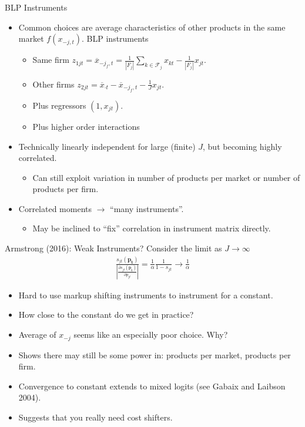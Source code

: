 \begin{frame}{BLP Instruments}
\begin{itemize}
\item Common choices are average characteristics of other products in the same market $f(x_{-j,t})$. \alert{BLP instruments}
\begin{itemize}
\item Same firm $z_{1jt} = \overline{x}_{-j_f,t} = \frac{1}{\left\vert{F_j}\right\vert}  \sum_{k \in \mathcal{F}_j} x_{kt} - \frac{1}{\left\vert{F_j}\right\vert} x_{jt}$.
\item Other firms $z_{2jt}=\overline{x}_{\cdot t} - \overline{x}_{-j_f,t} - \frac{1}{J} x_{jt}$.
\item Plus regressors $(1, x_{jt})$.
\item Plus higher order interactions 
\end{itemize}
\item Technically linearly independent for large (finite) $J$, but becoming highly correlated.
\begin{itemize}
\item Can still exploit variation in number of products per market or number of products per firm.
\end{itemize}
\item Correlated moments $\rightarrow$ ``many instruments''.
\begin{itemize}
\item May be inclined to ``fix'' correlation in instrument matrix directly.
\end{itemize}
\end{itemize}
\end{frame}


\begin{frame}{Armstrong (2016): Weak Instruments?}
Consider the limit as $J \rightarrow \infty$
\begin{eqnarray*}
\frac{s_{jt}(\mathbf{p_t})}{\left|\frac{\partial s_{jt}(\mathbf{p_t})}{\partial p_{jt}}\right|} = \frac{1}{\alpha} \frac{1}{1-s_{jt}} \rightarrow \frac{1}{\alpha}
\end{eqnarray*}
\begin{itemize}
\item Hard to use markup shifting instruments to instrument for a constant.
\item How close to the constant do we get in practice?
\item Average of $x_{-j}$ seems like an especially poor choice. Why?
\item Shows there may still be some power in: products per market, products per firm.
\item Convergence to constant extends to mixed logits (see Gabaix and Laibson 2004).
\item Suggests that you really need cost shifters.
\end{itemize}
\end{frame}



